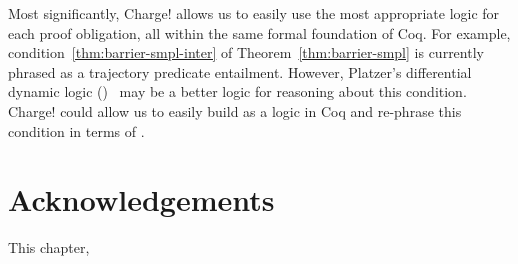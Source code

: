 Most significantly, Charge! allows us to easily use the most appropriate
logic for each proof obligation, all within the same formal foundation of
Coq. For example, condition~\eqref{thm:barrier-smpl-inter} of
Theorem~\ref{thm:barrier-smpl} is currently phrased as a trajectory
predicate entailment. However, Platzer's differential dynamic logic
(\dL{})~\cite{Platzer15substitution} may be a better logic for reasoning
about this condition. Charge! could allow us to easily build \dL{} as a
logic in Coq and re-phrase this condition in terms of \dL{}.




\section{Acknowledgements}
This chapter, \expsmplack{}
